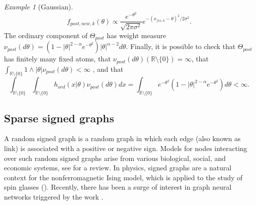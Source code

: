 \documentclass{article}
\theoremstyle{plain}
\theoremstyle{remark}
\newtheorem*{example}{Example}
\begin{document}
\begin{example}[Gaussian]
	\begin{equation*}
		f_{post,new,k}(\theta)\varpropto \frac{e^{-\theta^2}}{\sqrt{2\pi\sigma^2}}e^{-(x_{fix,k}-\theta)^{2}/ 2\sigma^{2}}.
	\end{equation*}
	The ordinary component of $\Theta_{post}$ has weight measure $\nu_{post}(d\theta)=(1-|\theta|^{2-\alpha}e^{-\theta^2}) |\theta|^{\alpha-2}d\theta$. Finally, it is possible to check that $\Theta_{post}$ has finitely many fixed atoms, that $\nu_{post}(d\theta)(\mathbb{R}\setminus\{0\})=\infty$, that $\int_{\mathbb{R}\setminus\{0\}}1\wedge|\theta|\nu_{post}(d\theta)<\infty$ , and that
	\begin{equation*}
		\int_{\mathbb{R}\setminus\{0\}}\int_{\mathbb{R}\setminus\{0\}}h_{ord}(x|\theta)\nu_{post}(d\theta)dx=\int_{\mathbb{R}\setminus\{0\}}e^{-\theta^2}(1-|\theta|^{2-\alpha}e^{-\theta^2})d\theta<\infty.
	\end{equation*}
\end{example}

\subsection{Sparse signed graphs}\label{Sec-graph}
A random signed graph is a random graph in which each edge (also known as link) is associated with a positive or negative sign. Models for nodes interacting over such random signed graphs arise from various biological, social, and economic systems, see \citet{Siam} for a review. In physics, signed graphs are a natural context for the nonferromagnetic Ising model, which is applied to the study of spin glasses (\citet{Ising}). Recently, there has been a surge of interest in graph neural networks triggered by the work \citet{Derr}. 
\end{document}
